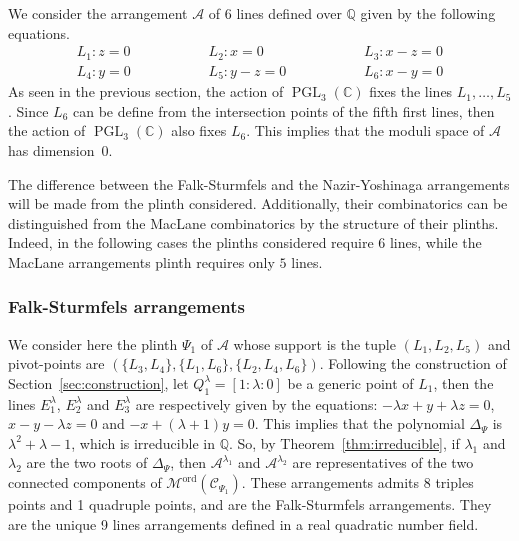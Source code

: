 \documentclass[11pt, a4paper]{amsart}
\theoremstyle{definition}
\theoremstyle{remark}
\newcommand{\CC}{\mathds{C}}
\newcommand{\QQ}{\mathds{Q}}
\newcommand{\A}{\mathcal{A}}
\newcommand{\C}{\mathcal{C}}
\newcommand{\M}{\mathcal{M}}
\newcommand{\ord}{\text{ord}}
\DeclareMathOperator{\PGL}{PGL}
\begin{document}
We consider the arrangement $\A$ of 6 lines defined over $\QQ$ given by the following equations.
\begin{equation*}
	\begin{array}{lll}
	 L_1: z=0  \hspace{2cm} & L_2: x=0 \hspace{2cm} & L_3: x-z=0 \\
	L_4: y=0  \hspace{2cm} & L_5: y-z=0 \hspace{2cm} & L_6: x-y=0
	\end{array}
\end{equation*}
As seen in the previous section, the action of $\PGL_3(\CC)$ fixes the lines $L_1,\dots,L_5$. Since $L_6$ can be define from the intersection points of the fifth first lines, then the action of $\PGL_3(\CC)$ also fixes $L_6$. This implies that the moduli space of $\A$ has dimension~0.

The difference between the Falk-Sturmfels and the Nazir-Yoshinaga arrangements will be made from the plinth considered. Additionally, their combinatorics can be distinguished from the MacLane combinatorics by the structure of their plinths. Indeed, in the following cases the plinths considered require $6$ lines, while the MacLane arrangements plinth requires only $5$ lines.

\subsubsection{Falk-Sturmfels arrangements}
We consider here the plinth $\Psi_1$ of $\A$ whose support is the tuple $(L_1,L_2,L_5)$ and pivot-points are $(\{L_3,L_4\},\{L_1,L_6\},\{L_2,L_4,L_6\})$. Following the construction of Section~\ref{sec:construction}, let $Q_1^\lambda=[1:\lambda:0]$ be a generic point of $L_1$, then the lines $E^\lambda_1$, $E^\lambda_2$ and $E^\lambda_3$ are respectively given by the equations: $ -\lambda x + y + \lambda z=0$, $x - y - \lambda z =0$ and $-x + (\lambda +1) y =0$. This implies that the polynomial $\Delta_\Psi$ is $\lambda^2+\lambda-1$, which is irreducible in $\QQ$. So, by Theorem~\ref{thm:irreducible}, if $\lambda_1$ and $\lambda_2$ are the two roots of $\Delta_{\Psi}$, then $\A^{\lambda_1}$ and $\A^{\lambda_2}$ are representatives of the two connected components of $\M^\ord(\C_{\Psi_1})$. These arrangements admits 8 triples points and 1 quadruple points, and are the Falk-Sturmfels arrangements. They are the unique 9 lines arrangements defined in a real quadratic number field.
\end{document}
